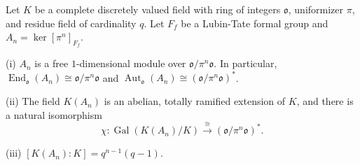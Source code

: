 Let $K$ be a complete discretely valued field with ring of integers $\mathfrak{o}$, uniformizer $\pi$, and residue field of cardinality $q$. Let $F_f$ be a Lubin-Tate formal group and $A_n = \ker[\pi^n]_{F_f}$.

(i) $A_n$ is a free $1$-dimensional module over $\mathfrak{o}/\pi^n\mathfrak{o}$. In particular, $\operatorname{End}_{\mathfrak{o}}(A_n) \cong \mathfrak{o}/\pi^n\mathfrak{o}$ and $\operatorname{Aut}_{\mathfrak{o}}(A_n) \cong (\mathfrak{o}/\pi^n\mathfrak{o})^*$.

(ii) The field $K(A_n)$ is an abelian, totally ramified extension of $K$, and there is a natural isomorphism
$$
\chi: \operatorname{Gal}(K(A_n)/K) \xrightarrow{\cong} (\mathfrak{o}/\pi^n\mathfrak{o})^*.
$$

(iii) $[K(A_n) : K] = q^{n-1}(q-1)$.

